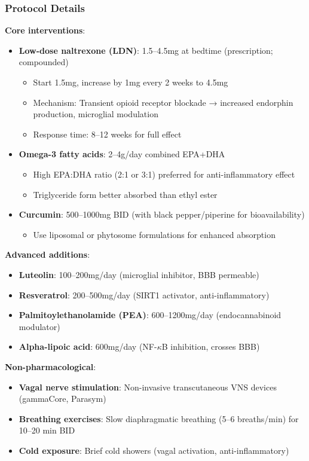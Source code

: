 \subsubsection{Protocol Details}

\textbf{Core interventions}:
\begin{itemize}
    \item \textbf{Low-dose naltrexone (LDN)}: 1.5--4.5mg at bedtime (prescription; compounded)
        \begin{itemize}
            \item Start 1.5mg, increase by 1mg every 2 weeks to 4.5mg
            \item Mechanism: Transient opioid receptor blockade → increased endorphin production, microglial modulation
            \item Response time: 8--12 weeks for full effect
        \end{itemize}
    \item \textbf{Omega-3 fatty acids}: 2--4g/day combined EPA+DHA
        \begin{itemize}
            \item High EPA:DHA ratio (2:1 or 3:1) preferred for anti-inflammatory effect
            \item Triglyceride form better absorbed than ethyl ester
        \end{itemize}
    \item \textbf{Curcumin}: 500--1000mg BID (with black pepper/piperine for bioavailability)
        \begin{itemize}
            \item Use liposomal or phytosome formulations for enhanced absorption
        \end{itemize}
\end{itemize}

\textbf{Advanced additions}:
\begin{itemize}
    \item \textbf{Luteolin}: 100--200mg/day (microglial inhibitor, BBB permeable)
    \item \textbf{Resveratrol}: 200--500mg/day (SIRT1 activator, anti-inflammatory)
    \item \textbf{Palmitoylethanolamide (PEA)}: 600--1200mg/day (endocannabinoid modulator)
    \item \textbf{Alpha-lipoic acid}: 600mg/day (NF-$\kappa$B inhibition, crosses BBB)
\end{itemize}

\textbf{Non-pharmacological}:
\begin{itemize}
    \item \textbf{Vagal nerve stimulation}: Non-invasive transcutaneous VNS devices (gammaCore, Parasym)
    \item \textbf{Breathing exercises}: Slow diaphragmatic breathing (5--6 breaths/min) for 10--20 min BID
    \item \textbf{Cold exposure}: Brief cold showers (vagal activation, anti-inflammatory)
\end{itemize}

